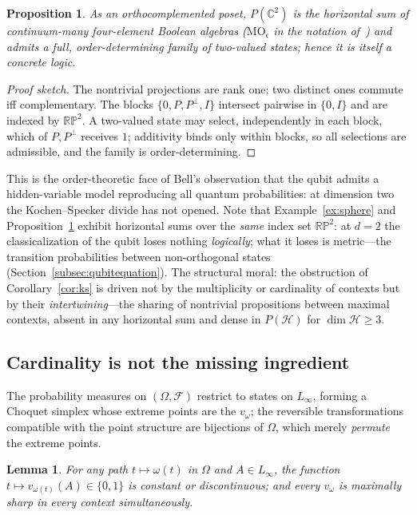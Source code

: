 \documentclass[11pt]{article}
\newtheorem{proposition}[theorem]{Proposition}
\newtheorem{lemma}[theorem]{Lemma}
\theoremstyle{definition}
\theoremstyle{remark}
\newcommand{\Hi}{\mathcal{H}}
\newcommand{\PH}{P(\Hi)}
\newcommand{\F}{\mathcal{F}}
\newcommand{\Linf}{L_{\infty}}
\newcommand{\Om}{\Omega}
\begin{document}
\begin{proposition}\label{prop:qubit}
As an orthocomplemented poset, $P(\mathbb{C}^{2})$ is the horizontal sum
of continuum-many four-element Boolean algebras
($\mathrm{MO}_{\mathfrak c}$ in the notation of \cite{Kalmbach1983}\,)
and admits a full, order-determining family of two-valued states; hence
it is itself a concrete logic.
\end{proposition}

\begin{proof}[Proof sketch]
The nontrivial projections are rank one; two distinct ones commute iff
complementary. The blocks $\{0,P,P^{\perp},I\}$ intersect pairwise in
$\{0,I\}$ and are indexed by $\mathbb{RP}^{2}$. A two-valued state may
select, independently in each block, which of $P,P^{\perp}$ receives
$1$; additivity binds only within blocks, so all selections are
admissible, and the family is order-determining.
\end{proof}

This is the order-theoretic face of Bell's observation \cite{Bell1966}
that the qubit admits a hidden-variable model reproducing all quantum
probabilities: at dimension two the Kochen--Specker divide has not
opened. Note that Example~\ref{ex:sphere} and
Proposition~\ref{prop:qubit} exhibit horizontal sums over the
\emph{same} index set $\mathbb{RP}^{2}$: at $d=2$ the classicalization
of the qubit loses nothing \emph{logically}; what it loses is
metric---the transition probabilities between non-orthogonal states
(Section~\ref{subsec:qubitequation}). The structural moral: the
obstruction of Corollary~\ref{cor:ks} is driven not by the multiplicity
or cardinality of contexts but by their \emph{intertwining}---the
sharing of nontrivial propositions between maximal contexts, absent in
any horizontal sum and dense in $\PH$ for $\dim\Hi\ge3$.

\subsection{Cardinality is not the missing ingredient}

The probability measures on $(\Om,\F)$ restrict to states on $\Linf$,
forming a Choquet simplex whose extreme points are the $v_{\omega}$;
the reversible transformations compatible with the point structure are
bijections of $\Om$, which merely \emph{permute} the extreme points.

\begin{lemma}\label{lem:discrete}
For any path $t\mapsto\omega(t)$ in $\Om$ and $A\in\Linf$, the function
$t\mapsto v_{\omega(t)}(A)\in\{0,1\}$ is constant or discontinuous; and
every $v_{\omega}$ is maximally sharp in every context simultaneously.
\end{lemma}
\end{document}
